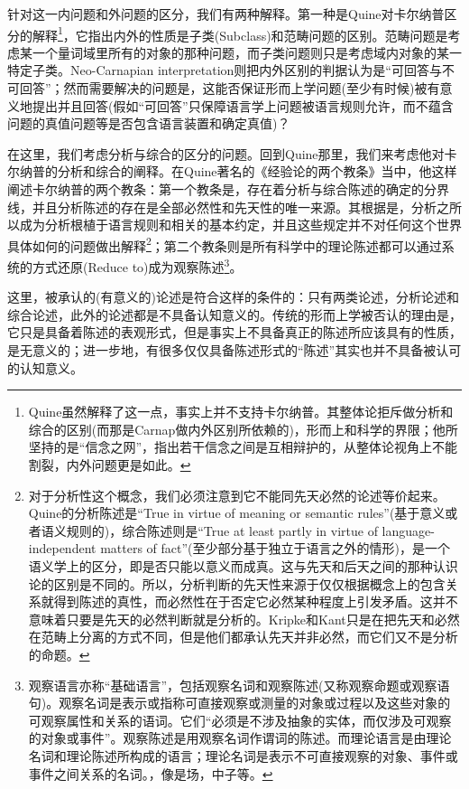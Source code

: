 \documentclass{article}
\begin{document}
针对这一内问题和外问题的区分，我们有两种解释。第一种是Quine对卡尔纳普区分的解释\footnote{Quine虽然解释了这一点，事实上并不支持卡尔纳普。其整体论拒斥做分析和综合的区别(而那是Carnap做内外区别所依赖的)，形而上和科学的界限；他所坚持的是“信念之网”，指出若干信念之间是互相辩护的，从整体论视角上不能割裂，内外问题更是如此。}，它指出内外的性质是子类(Subclass)和范畴问题的区别。范畴问题是考虑某一个量词域里所有的对象的那种问题，而子类问题则只是考虑域内对象的某一特定子类。Neo-Carnapian interpretation则把内外区别的判据认为是“可回答与不可回答”；然而需要解决的问题是，这能否保证形而上学问题(至少有时候)被有意义地提出并且回答(假如“可回答”只保障语言学上问题被语言规则允许，而不蕴含问题的真值问题等是否包含语言装置和确定真值)？

在这里，我们考虑分析与综合的区分的问题。回到Quine那里，我们来考虑他对卡尔纳普的分析和综合的阐释。在Quine著名的《经验论的两个教条》当中，他这样阐述卡尔纳普的两个教条：第一个教条是，存在着分析与综合陈述的确定的分界线，并且分析陈述的存在是全部必然性和先天性的唯一来源。其根据是，分析之所以成为分析根植于语言规则和相关的基本约定，并且这些规定并不对任何这个世界具体如何的问题做出解释\footnote{对于分析性这个概念，我们必须注意到它不能同先天必然的论述等价起来。Quine的分析陈述是“True in virtue of meaning or semantic  rules”(基于意义或者语义规则的)，综合陈述则是“True at least partly in virtue of language-independent matters of fact”(至少部分基于独立于语言之外的情形)，是一个语义学上的区分，即是否只能以意义而成真。这与先天和后天之间的那种认识论的区别是不同的。所以，分析判断的先天性来源于仅仅根据概念上的包含关系就得到陈述的真性，而必然性在于否定它必然某种程度上引发矛盾。这并不意味着只要是先天的必然判断就是分析的。Kripke和Kant只是在把先天和必然在范畴上分离的方式不同，但是他们都承认先天并非必然，而它们又不是分析的命题。}；第二个教条则是所有科学中的理论陈述都可以通过系统的方式还原(Reduce to)成为观察陈述\footnote{观察语言亦称“基础语言”，包括观察名词和观察陈述(又称观察命题或观察语句)。观察名词是表示或指称可直接观察或测量的对象或过程以及这些对象的可观察属性和关系的语词。它们“必须是不涉及抽象的实体，而仅涉及可观察的对象或事件”。观察陈述是用观察名词作谓词的陈述。而理论语言是由理论名词和理论陈述所构成的语言；理论名词是表示不可直接观察的对象、事件或事件之间关系的名词。，像是场，中子等。}。

这里，被承认的(有意义的)论述是符合这样的条件的：只有两类论述，分析论述和综合论述，此外的论述都是不具备认知意义的。传统的形而上学被否认的理由是，它只是具备着陈述的表观形式，但是事实上不具备真正的陈述所应该具有的性质，是无意义的；进一步地，有很多仅仅具备陈述形式的“陈述”其实也并不具备被认可的认知意义。
\end{document}
